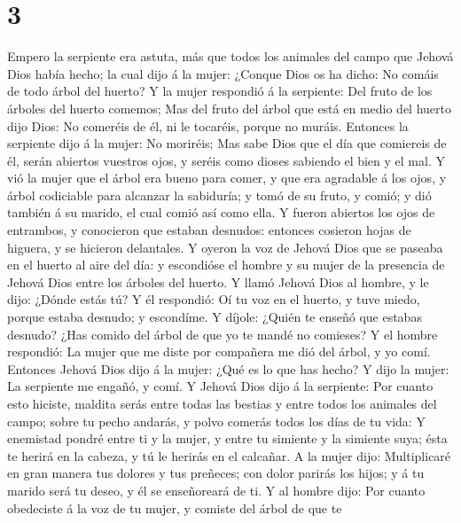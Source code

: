 \hypertarget{section-2}{%
\section{3}\label{section-2}}

 Empero la serpiente era astuta, más que todos los
animales del campo que Jehová Dios había hecho; la cual dijo á la mujer:
¿Conque Dios os ha dicho: No comáis de todo árbol del huerto?
 Y la mujer respondió á la serpiente: Del fruto de los
árboles del huerto comemos;  Mas del fruto del árbol que
está en medio del huerto dijo Dios: No comeréis de él, ni le tocaréis,
porque no muráis.  Entonces la serpiente dijo á la mujer:
No moriréis;  Mas sabe Dios que el día que comiereis de
él, serán abiertos vuestros ojos, y seréis como dioses sabiendo el bien
y el mal.  Y vió la mujer que el árbol era bueno para
comer, y que era agradable á los ojos, y árbol codiciable para alcanzar
la sabiduría; y tomó de su fruto, y comió; y dió también á su marido, el
cual comió así como ella.  Y fueron abiertos los ojos de
entrambos, y conocieron que estaban desnudos: entonces cosieron hojas de
higuera, y se hicieron delantales.  Y oyeron la voz de
Jehová Dios que se paseaba en el huerto al aire del día: y escondióse el
hombre y su mujer de la presencia de Jehová Dios entre los árboles del
huerto.  Y llamó Jehová Dios al hombre, y le dijo: ¿Dónde
estás tú?  Y él respondió: Oí tu voz en el huerto, y tuve
miedo, porque estaba desnudo; y escondíme.  Y díjole:
¿Quién te enseñó que estabas desnudo? ¿Has comido del árbol de que yo te
mandé no comieses?  Y el hombre respondió: La mujer que
me diste por compañera me dió del árbol, y yo comí. 
Entonces Jehová Dios dijo á la mujer: ¿Qué es lo que has hecho? Y dijo
la mujer: La serpiente me engañó, y comí.  Y Jehová Dios
dijo á la serpiente: Por cuanto esto hiciste, maldita serás entre todas
las bestias y entre todos los animales del campo; sobre tu pecho
andarás, y polvo comerás todos los días de tu vida:  Y
enemistad pondré entre ti y la mujer, y entre tu simiente y la simiente
suya; ésta te herirá en la cabeza, y tú le herirás en el calcañar.
 A la mujer dijo: Multiplicaré en gran manera tus dolores
y tus preñeces; con dolor parirás los hijos; y á tu marido será tu
deseo, y él se enseñoreará de ti.  Y al hombre dijo: Por
cuanto obedeciste á la voz de tu mujer, y comiste del árbol de que te
